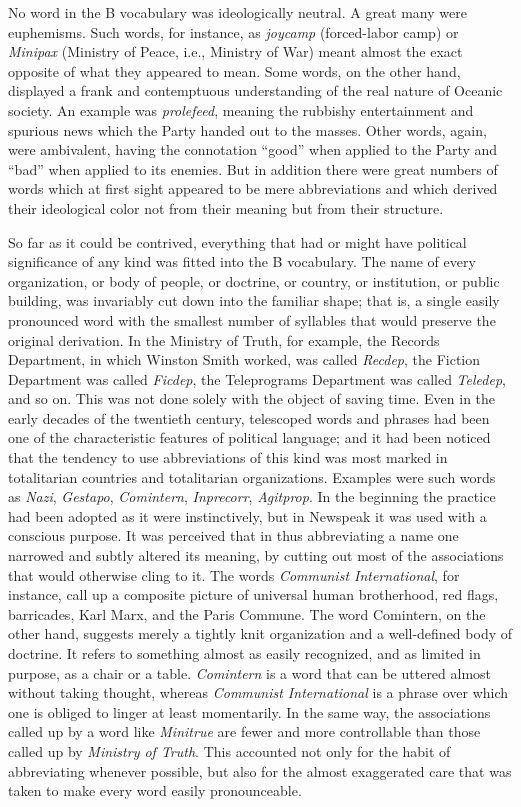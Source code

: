 No word in the B vocabulary was ideologically neutral. A great many were
euphemisms. Such words, for instance, as \emph{joycamp} (forced-labor
camp) or \emph{Minipax} (Ministry of Peace, i.e., Ministry of War) meant
almost the exact opposite of what they appeared to mean. Some words, on
the other hand, displayed a frank and contemptuous understanding of the
real nature of Oceanic society. An example was \emph{prolefeed}, meaning
the rubbishy entertainment and spurious news which the Party handed out
to the masses. Other words, again, were ambivalent, having the
connotation ``good'' when applied to the Party and ``bad'' when applied to
its enemies. But in addition there were great numbers of words which at
first sight appeared to be mere abbreviations and which derived their
ideological color not from their meaning but from their structure.

So far as it could be contrived, everything that had or might have
political significance of any kind was fitted into the B vocabulary. The
name of every organization, or body of people, or doctrine, or country,
or institution, or public building, was invariably cut down into the
familiar shape; that is, a single easily pronounced word with the
smallest number of syllables that would preserve the original
derivation. In the Ministry of Truth, for example, the Records
Department, in which Winston Smith worked, was called \emph{Recdep}, the
Fiction Department was called \emph{Ficdep}, the Teleprograms Department
was called \emph{Teledep}, and so on. This was not done solely with the
object of saving time. Even in the early decades of the twentieth
century, telescoped words and phrases had been one of the characteristic
features of political language; and it had been noticed that the
tendency to use abbreviations of this kind was most marked in
totalitarian countries and totalitarian organizations. Examples were
such words as \emph{Nazi}, \emph{Gestapo}, \emph{Comintern},
\emph{Inprecorr}, \emph{Agitprop}. In the beginning the practice had
been adopted as it were instinctively, but in Newspeak it was used with
a conscious purpose. It was perceived that in thus abbreviating a name
one narrowed and subtly altered its meaning, by cutting out most of the
associations that would otherwise cling to it. The words \emph{Communist
International}, for instance, call up a composite picture of universal
human brotherhood, red flags, barricades, Karl Marx, and the Paris
Commune. The word Comintern, on the other hand, suggests merely a
tightly knit organization and a well-defined body of doctrine. It refers
to something almost as easily recognized, and as limited in purpose, as
a chair or a table. \emph{Comintern} is a word that can be uttered
almost without taking thought, whereas \emph{Communist International} is
a phrase over which one is obliged to linger at least momentarily. In
the same way, the associations called up by a word like \emph{Minitrue}
are fewer and more controllable than those called up by \emph{Ministry
of Truth}. This accounted not only for the habit of abbreviating
whenever possible, but also for the almost exaggerated care that was
taken to make every word easily pronounceable.

